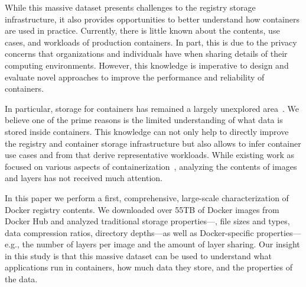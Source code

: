 While this massive dataset presents challenges to the registry storage infrastructure,
it also provides opportunities to better understand how containers are
used in practice. Currently, there is little known about the contents, use cases, and
workloads of production containers. In part, this is due to the privacy concerns that
organizations and individuals have when sharing details of their computing
environments. However, this knowledge is imperative to design and evaluate novel
approaches to improve the performance and reliability of containers.

In particular, storage for containers has remained a largely unexplored
area~\cite{login-container-storage-options}. We believe one of the prime
reasons is the limited understanding of what data is stored inside containers.
This knowledge can not only help to directly improve the registry and container
storage infrastructure but also allows to infer container use cases and from that
derive representative workloads. While existing work as focused on various
aspects of containerization~\cite{prev-work-1, prev-work-2, prev-work-3},
analyzing the contents of images and layers has not received much attention.

%
%
%


%

In this paper we perform a first, comprehensive, large-scale characterization of
Docker registry contents.
%
We downloaded over 55TB of Docker images from Docker Hub and analyzed
traditional storage properties---\eg, file sizes and types, data compression
ratios, directory depths---as well as Docker-specific properties---e.g., the number
of layers per image and the amount of layer sharing.
%
Our insight in this study is that this massive dataset can be used to understand what
applications run in containers, how much data they store, and the properties of
the data.

